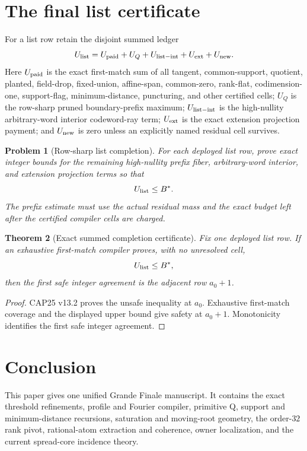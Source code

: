 \documentclass[11pt,a4paper]{amsart}
\numberwithin{equation}{section}
\newtheorem{theorem}{Theorem}[section]
\newtheorem{problem}[theorem]{Problem}
\theoremstyle{remark}
\begin{document}
\section{The final list certificate}
\label{sec:list-final-certificate}
For a list row retain the disjoint summed ledger
\begin{equation}
 U_{\rm list}
 =U_{\rm paid}+U_Q+U_{\rm list-int}+U_{\rm ext}+U_{\rm new}.
 \label{eq:list-final-ledger}
\end{equation}
Here $U_{\rm paid}$ is the exact first-match sum of all tangent, common-support, quotient, planted, field-drop, fixed-union, affine-span, common-zero, rank-flat, codimension-one, support-flag, minimum-distance, puncturing, and other certified cells; $U_Q$ is the row-sharp pruned boundary-prefix maximum; $U_{\rm list-int}$ is the high-nullity arbitrary-word interior codeword-ray term; $U_{\rm ext}$ is the exact extension projection payment; and $U_{\rm new}$ is zero unless an explicitly named residual cell survives.

\begin{problem}[Row-sharp list completion]\label{prob:list-completion}
For each deployed list row, prove exact integer bounds for the remaining high-nullity prefix fiber, arbitrary-word interior, and extension projection terms so that
\[
 U_{\rm list}\le B^*.
\]
The prefix estimate must use the actual residual mass and the exact budget left after the certified compiler cells are charged.
\end{problem}

\begin{theorem}[Exact summed completion certificate]\label{thm:exact-completion-certificate}
Fix one deployed list row.  If an exhaustive first-match compiler proves, with no unresolved cell,
\[
 U_{\rm list}\le B^*,
\]
then the first safe integer agreement is the adjacent row $a_0+1$.
\end{theorem}

\begin{proof}
CAP25 v13.2 proves the unsafe inequality at $a_0$.  Exhaustive first-match coverage and the displayed upper bound give safety at $a_0+1$.  Monotonicity identifies the first safe integer agreement.
\end{proof}

\section{Conclusion}\label{sec:conclusion}
This paper gives one unified Grande Finale manuscript.  It contains the exact threshold refinements, profile and Fourier compiler, primitive Q, support and minimum-distance recursions, saturation and moving-root geometry, the order-$32$ rank pivot, rational-atom extraction and coherence, owner localization, and the current spread-core incidence theory.
\end{document}
